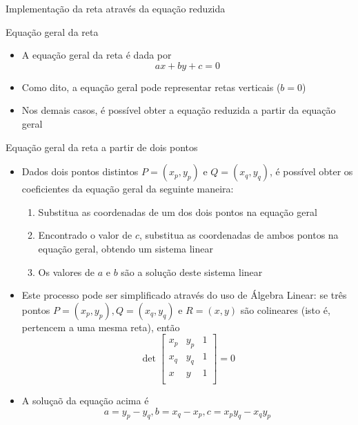 \begin{frame}[fragile]{Implementação da reta através da equação reduzida}
\end{frame}

\begin{frame}[fragile]{Equação geral da reta}

    \begin{itemize}
        \item A equação geral da reta é dada por
        \[
            ax + by + c = 0
        \]
        \pause

        \item Como dito, a equação geral pode representar retas verticais ($b = 0$)
        \pause

        \item Nos demais casos, é possível obter a equação reduzida a partir da equação geral
        \pause


    \end{itemize}

\end{frame}

\begin{frame}[fragile]{Equação geral da reta a partir de dois pontos}

    \begin{itemize}
        \item Dados dois pontos distintos $P = (x_p, y_p)$ e $Q = (x_q, y_q)$, é possível obter os 
        coeficientes da equação geral da seguinte maneira:
        \pause

        \begin{enumerate}
            \item Substitua as coordenadas de um dos dois pontos na equação geral
        \pause
            \item Encontrado o valor de $c$, substitua as coordenadas de ambos pontos na equação
            geral, obtendo um sistema linear
        \pause
            \item Os valores de $a$ e $b$ são a solução deste sistema linear
        \end{enumerate}
        \pause

        \item Este processo pode ser simplificado através do uso de Álgebra Linear: se três pontos 
        $P = (x_p, y_p), Q = (x_q, y_q)$ e $R = (x, y)$ são colineares 
        (isto é, pertencem a uma mesma reta), então
        \[
            \det \begin{bmatrix}
                x_p & y_p  & 1 \\
                x_q & y_q  & 1 \\
                x & y  & 1 \\
            \end{bmatrix} = 0
        \]
        \pause

        \item A soluçaõ da equação acima é
        \[
            a = y_p - y_q, b = x_q - x_p, c = x_py_q - x_qy_p
        \]
    \end{itemize}
\end{frame}

